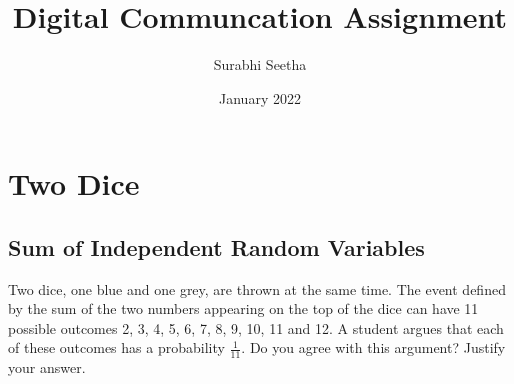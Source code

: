 \documentclass[journal,10pt,twocolumn]{IEEEtran}
\numberwithin{equation}{subsection}
\numberwithin{figure}{subsection}
\begin{document}
\title{Digital Communcation Assignment}

\author{Surabhi Seetha}
\date{January 2022}

\maketitle

\tableofcontents

\bigskip


\section{Two Dice}
\subsection{\textbf{Sum of Independent Random Variables}}
Two dice, one blue and one grey, are thrown at the same time.   The event defined by the sum of the two numbers appearing on the top of the dice can have 11 possible outcomes 2, 3, 4, 5, 6, 7, 8, 9, 10, 11 and 12.  A student argues that each of these outcomes has a probability $\frac{1}{11}$.  Do you agree with this argument?  Justify your answer.
\end{document}
